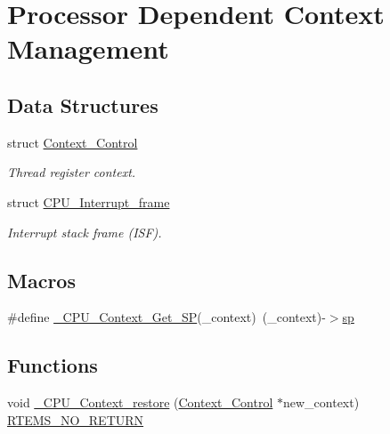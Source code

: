 \hypertarget{group__RTEMSScoreCPUlm32Context}{}\section{Processor Dependent Context Management}
\label{group__RTEMSScoreCPUlm32Context}
\subsection*{Data Structures}
\begin{DoxyCompactItemize}
\item 
struct \mbox{\hyperlink{structContext__Control}{Context\+\_\+\+Control}}
\begin{DoxyCompactList}\small\item\em Thread register context. \end{DoxyCompactList}\item 
struct \mbox{\hyperlink{structCPU__Interrupt__frame}{C\+P\+U\+\_\+\+Interrupt\+\_\+frame}}
\begin{DoxyCompactList}\small\item\em Interrupt stack frame (I\+SF). \end{DoxyCompactList}\end{DoxyCompactItemize}
\subsection*{Macros}
\begin{DoxyCompactItemize}
\item 
\#define \mbox{\hyperlink{group__RTEMSScoreCPUlm32Context_ga896055157b72692a6141f7c0039eabdf}{\+\_\+\+C\+P\+U\+\_\+\+Context\+\_\+\+Get\+\_\+\+SP}}(\+\_\+context)~(\+\_\+context)-\/$>$\mbox{\hyperlink{group__mips__regs_ga8d40798874dab99986478ef00ff3e297}{sp}}
\end{DoxyCompactItemize}
\subsection*{Functions}
\begin{DoxyCompactItemize}
\item 
void \mbox{\hyperlink{group__RTEMSScoreCPUlm32Context_ga80726ebfe00f31a88b086cc4474c472f}{\+\_\+\+C\+P\+U\+\_\+\+Context\+\_\+restore}} (\mbox{\hyperlink{structContext__Control}{Context\+\_\+\+Control}} $\ast$new\+\_\+context) \mbox{\hyperlink{group__RTEMSScoreBaseDefs_gaa2f0ed67aa174f684bb31b7e8bdb386f}{R\+T\+E\+M\+S\+\_\+\+N\+O\+\_\+\+R\+E\+T\+U\+RN}}
\end{DoxyCompactItemize}


